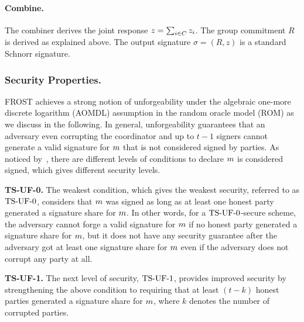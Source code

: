 \paragraph{Combine.}
The combiner derives the joint response $z = \sum_{i \in C} z_i$.
The group commitment $R$ is derived as explained above.
The output signature $\sigma = (R,z)$ is a standard Schnorr signature.

\subsubsection{Security Properties.}
FROST achieves a strong notion of unforgeability under the algebraic one-more discrete logarithm (AOMDL) assumption in the random oracle model (ROM) as we discuss in the following.
In general, unforgeability guarantees that an adversary even corrupting the coordinator and up to $t-1$ signers cannot generate a valid signature for $m$ that is not considered signed by parties. As noticed by~\cite{BellareCKMTZ22}, there are different levels of conditions to declare $m$ is considered signed, which gives different security levels.


\medskip

\textbf{TS-UF-0.} The weakest condition, which gives the weakest security, referred to as $\mathrm{TS}\mbox{-}\mathrm{UF}\mbox{-}{0}$, considers that $m$ was signed as long as at least one honest party generated a signature share for $m$. In other words, for a $\mathrm{TS}\mbox{-}\mathrm{UF}\mbox{-}{0}$-secure scheme, the adversary cannot forge a valid signature for $m$ if no honest party generated a signature share for $m$, but it does not have any security guarantee after the adversary got at least one signature share for $m$ even if the adversary does not corrupt any party at all.

\medskip

\textbf{TS-UF-1.} The next level of security, $\mathrm{TS}\mbox{-}\mathrm{UF}\mbox{-}{1}$, provides improved security by strengthening the above condition to requiring that at least $(t - k)$ honest parties generated a signature share for $m$,
where $k$ denotes the number of corrupted parties.

\medskip

